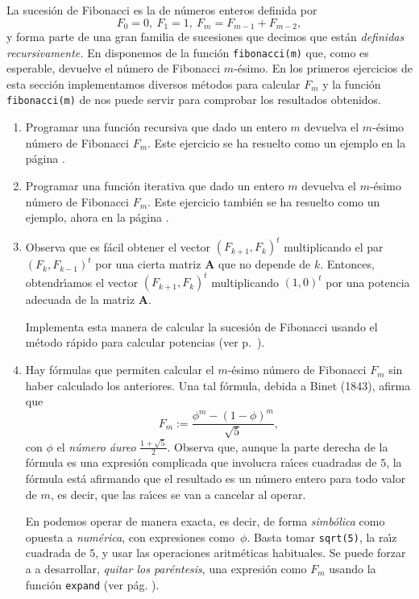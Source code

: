 La sucesi\'on de Fibonacci es la de n\'umeros enteros  definida por
\[F_0=0,\ F_1=1,\ F_m=F_{m-1}+F_{m-2},\]
\noindent y forma parte de una gran familia de sucesiones que decimos que
est\'an {\itshape definidas recursivamente.} En {\sage} disponemos de la
funci\'on \lstinline|fibonacci(m)| que, como es esperable,  devuelve el n\'umero
de Fibonacci $m$-\'esimo.  En los primeros ejercicios de esta secci\'on
implementamos diversos m\'etodos para calcular $F_m$ y la funci\'on
\lstinline|fibonacci(m)| de {\sage} nos puede servir para comprobar los
resultados obtenidos. 

\pagebreak[3]

\begin{ejer}
 \begin{enumerate}
  \item Programar una funci\'on recursiva que dado un entero $m$ devuelva el
$m$-\'esimo n\'umero de Fibonacci $F_m$.  Este ejercicio se ha resuelto como un
ejemplo en la p\'agina \pageref{fibor}.
  \item Programar una funci\'on iterativa  que dado un entero $m$ devuelva
el $m$-\'esimo n\'umero de Fibonacci $F_m$. Este ejercicio tambi\'en se ha
resuelto como un
ejemplo, ahora  en la p\'agina \pageref{fiboi}.
  \item \label{fib-matriz}Observa que es f\'acil obtener el vector
$(F_{k+1},F_k)^t$
multiplicando el par $(F_{k},F_{k-1})^t$ por una cierta matriz $\mathbf{A}$ que
no depende de $k$. Entonces, obtendr\'{\i}amos el vector $(F_{k+1},F_k)^t$
multiplicando $(1,0)^t$ por una potencia adecuada de la matriz $\mathbf{A}$.

Implementa esta manera de calcular la sucesi\'on de Fibonacci usando el
m\'etodo r\'apido para calcular potencias (ver p.~\pageref{potencias}). 
 
 \item Hay f\'ormulas que permiten calcular el $m$-\'esimo número de Fibonacci
$F_m$ sin haber calculado los anteriores. Una tal f\'ormula, debida a Binet
(1843),  
afirma que
\[F_m:=\frac{\phi^m-(1-\phi)^m}{\sqrt{5}},\]
con $\phi$ el {\itshape n\'umero áureo} $\frac{1+\sqrt{5}}{2}$. Observa que,
aunque la parte derecha de la f\'ormula es una expresi\'on complicada que
involucra ra\'{\i}ces cuadradas de $5$, la f\'ormula est\'a afirmando que el
resultado es un n\'umero entero para todo valor de $m$, es decir, que las
ra\'{\i}ces se van a cancelar al operar.

    En {\sage}  podemos operar de manera exacta, es decir, de forma {\itshape
simb\'olica} como opuesta a {\itshape numérica},  con expresiones como~$\phi$.
Basta tomar  \lstinline|sqrt(5)|, la ra\'{\i}z cuadrada de $5$, y usar las
operaciones aritm\'eticas habituales. Se puede forzar a {\sage} a desarrollar,
{\itshape quitar los par\'entesis},   una expresión como $F_m$ usando la función
\lstinline|expand| (ver p\'ag. \pageref{expand}). 


\end{enumerate}
\end{ejer}
